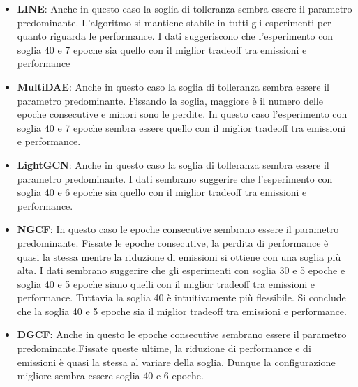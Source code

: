 \begin{itemize}
    \item \textbf{LINE}: Anche in questo caso la soglia di tolleranza sembra essere il parametro predominante. L'algoritmo si mantiene stabile in tutti gli esperimenti per quanto riguarda le performance. I dati suggeriscono che l'esperimento con soglia 40 e 7 epoche sia quello con il miglior tradeoff tra emissioni e performance
    \item \textbf{MultiDAE}: Anche in questo caso la soglia di tolleranza sembra essere il parametro predominante. Fissando la soglia, maggiore è il numero delle epoche consecutive e minori sono le perdite. In questo caso l'esperimento con soglia 40 e 7 epoche sembra essere quello con il miglior tradeoff tra emissioni e performance.
    \item \textbf{LightGCN}: Anche in questo caso la soglia di tolleranza sembra essere il parametro predominante. I dati sembrano suggerire che l'esperimento con soglia 40 e 6 epoche sia quello con il miglior tradeoff tra emissioni e performance.
    \item \textbf{NGCF}: In questo caso le epoche consecutive sembrano essere il parametro predominante. Fissate le epoche consecutive, la perdita di performance è quasi la stessa mentre la riduzione di emissioni si ottiene con una soglia più alta. I dati sembrano suggerire che gli esperimenti con soglia 30 e 5 epoche e soglia 40 e 5 epoche siano quelli con il miglior tradeoff tra emissioni e performance. Tuttavia la soglia 40 è intuitivamente più flessibile. Si conclude che la soglia 40 e 5 epoche sia il miglior tradeoff tra emissioni e performance.
    \item \textbf{DGCF}: Anche in questo le epoche consecutive sembrano essere il parametro predominante.Fissate queste ultime, la riduzione di performance e di emissioni è quasi la stessa al variare della soglia. Dunque la configurazione migliore sembra essere soglia 40 e 6 epoche.
\end{itemize}


\begin{table}[H]
    \centering
    \caption{Confronto tra i parametri del criterio}
    \end{table}

